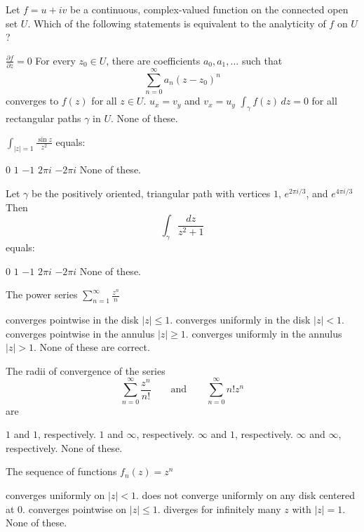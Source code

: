 \documentclass[12pt]{exam}
\begin{document}
\begin{questions}
\question
Let $f=u + iv$ be a continuous, complex-valued function on the connected open set $U$.
Which of the following statements is equivalent to the analyticity of $f$ on $U$?
\begin{choices}
    \choice $\displaystyle \frac{\partial f}{\partial z}=0$
    \choice For every $z_0\in U$, there are coefficients $a_0,a_1,\ldots$ such that
    \[
        \sum_{n=0}^\infty a_n(z-z_0)^n
    \]
    converges to $f(z)$ for all $z\in U$.
    \choice $u_x=v_y$ and $v_x = u_y$
    \choice $\displaystyle \int_\gamma f(z)\,dz=0$ for all rectangular paths $\gamma$ in $U$.
    \choice None of these.
\end{choices}

\question
$\displaystyle\int_{|z|=1} \frac{\sin z}{z^2}$ equals:
\begin{choices}
    \choice $0$
    \choice $1$
    \choice $-1$
    \choice $2\pi i$
    \choice $-2\pi i$
    \choice None of these.
\end{choices}



\question
Let $\gamma$ be the positively oriented, triangular path with vertices $1$, $e^{2\pi i/3}$, and $e^{4\pi i/3}$
Then
\[
    \int_{\gamma}\frac{dz}{z^2+1}
\]
equals:
\begin{choices}
    \choice $0$
    \choice $1$
    \choice $-1$
    \choice $2\pi i$
    \choice $-2\pi i$
    \choice None of these.
\end{choices}


\question
The power series
    $\displaystyle \sum_{n=1}^\infty \frac{z^n}n$
\begin{choices}
    \choice converges pointwise in the disk $|z|\leq 1$.
    \choice converges uniformly in the disk $|z|<1$.
    \choice converges pointwise in the annulus $|z|\geq 1$.
    \choice converges uniformly in the annulus $|z|>1$.
    \choice None of these are correct.
\end{choices}


\question
The radii of convergence of the series
\[
    \sum_{n=0}^\infty \frac{z^n}{n!}\qquad\text{and}\qquad
    \sum_{n=0}^\infty n!z^n
\]
are
\begin{choices}
    \choice $1$ and $1$, respectively.
    \choice $1$ and $\infty$, respectively.
    \choice $\infty$ and $1$, respectively.
    \choice $\infty$ and $\infty$, respectively.
    \choice None of these.
\end{choices}


\question
The sequence of functions $f_n(z)=z^n$
\begin{choices}
    \choice converges uniformly on $|z|<1$.
    \choice does not converge uniformly on any disk centered at $0$.
    \choice converges pointwise on $|z|\leq 1$.
    \choice diverges for infinitely many $z$ with $|z|=1$.
    \choice None of these.
\end{choices}



\end{questions}
\end{document}

